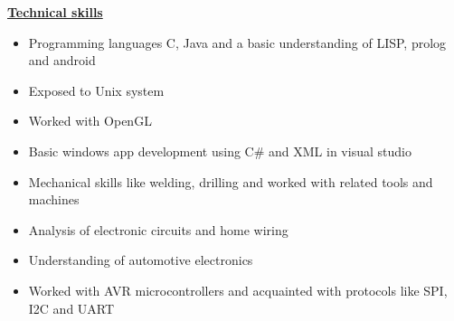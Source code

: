 \documentclass[10pt]{article}
\begin{document}
		\underline{\textbf{\Large{Technical skills}}}
		\begin{itemize}
			\item{Programming languages C, Java and a basic understanding of LISP, prolog and android}
			\item{Exposed to Unix system}
			\item{Worked with OpenGL}					
			\item{Basic windows app development using C\# and XML in visual studio}
			\item{Mechanical skills like welding, drilling and worked with related tools and machines}
			\item{Analysis of electronic circuits and home wiring}
			\item{Understanding of automotive electronics}
			\item{Worked with AVR microcontrollers and acquainted with protocols like SPI, I2C and UART}
		\end{itemize}
		
		\hfill 
	
\end{document}
